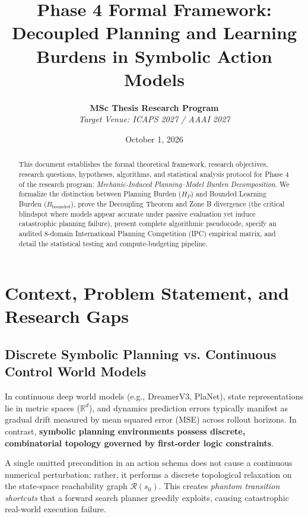 \documentclass[11pt,a4paper]{article}
\title{\textbf{Phase 4 Formal Framework: Decoupled Planning and Learning Burdens in Symbolic Action Models}}
\author{\textbf{MSc Thesis Research Program} \\ \textit{Target Venue: ICAPS 2027 / AAAI 2027}}
\date{October 1, 2026}
\theoremstyle{definition}
\begin{document}
\maketitle

\begin{abstract}
This document establishes the formal theoretical framework, research objectives, research questions, hypotheses, algorithms, and statistical analysis protocol for Phase 4 of the research program: \textit{Mechanic-Induced Planning--Model Burden Decomposition}. We formalize the distinction between Planning Burden ($H_P$) and Bounded Learning Burden ($B_{\text{bounded}}$), prove the Decoupling Theorem and Zone B divergence (the critical blindspot where models appear accurate under passive evaluation yet induce catastrophic planning failure), present complete algorithmic pseudocode, specify an audited 8-domain International Planning Competition (IPC) empirical matrix, and detail the statistical testing and compute-budgeting pipeline.
\end{abstract}

\section{Context, Problem Statement, and Research Gaps}

\subsection{Discrete Symbolic Planning vs. Continuous Control World Models}
In continuous deep world models (e.g., DreamerV3, PlaNet), state representations lie in metric spaces ($\mathbb{R}^d$), and dynamics prediction errors typically manifest as gradual drift measured by mean squared error (MSE) across rollout horizons. In contrast, \textbf{symbolic planning environments possess discrete, combinatorial topology governed by first-order logic constraints}. 

A single omitted precondition in an action schema does not cause a continuous numerical perturbation; rather, it performs a discrete topological relaxation on the state-space reachability graph $\mathcal{R}(s_0)$. This creates \textit{phantom transition shortcuts} that a forward search planner greedily exploits, causing catastrophic real-world execution failure.
\end{document}
